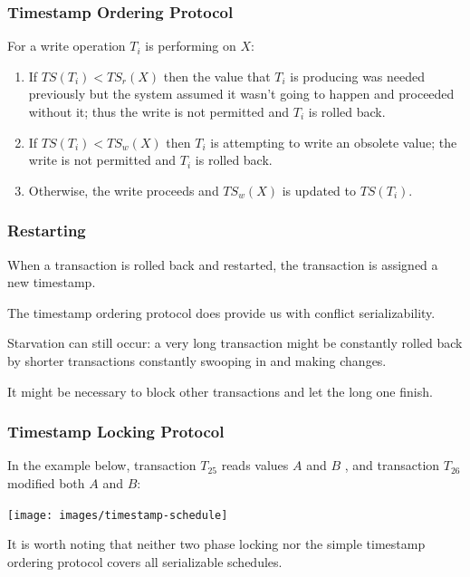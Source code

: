 \begin{frame}
\frametitle{Timestamp Ordering Protocol}

For a write operation $T_{i}$ is performing on $X$:
\begin{enumerate}

\item If $T\!S(T_{i}) < T\!S_{r}(X)$ then the value that $T_{i}$ is producing was needed previously but the system assumed it wasn't going to happen and proceeded without it; thus the write is not permitted and $T_{i}$ is rolled back.
\item If $T\!S(T_{i}) < T\!S_{w}(X)$ then $T_{i}$ is attempting to write an obsolete value; the write is not permitted and $T_{i}$ is rolled back.
\item Otherwise, the write proceeds and $T\!S_{w}(X)$ is updated to $T\!S(T_{i})$. 

\end{enumerate}


\end{frame}

\begin{frame}
\frametitle{Restarting}

When a transaction is rolled back and restarted, the transaction is assigned a new timestamp. 

The timestamp ordering protocol does provide us with conflict serializability.

Starvation can still occur: a very long transaction might be constantly rolled back by shorter transactions constantly swooping in and making changes.

It might be necessary to block other transactions and let the long one finish.


\end{frame}

\begin{frame}
\frametitle{Timestamp Locking Protocol}

In the example below, transaction $T_{25}$ reads values $A$ and $B$ , and transaction $T_{26}$ modified both $A$ and $B$:

\begin{center}
	\texttt{[image: images/timestamp-schedule]}
\end{center}

It is worth noting that neither two phase locking nor the simple timestamp ordering protocol covers all serializable schedules.


\end{frame}

